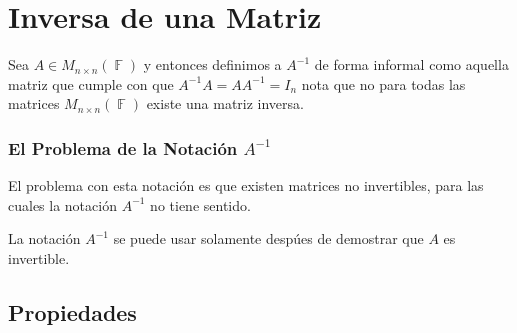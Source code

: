 \documentclass[12pt, fleqn]{report}                             %
\theoremstyle{break}                                            %
\DeclareMathOperator \GenericField {\mathbb{F}}                 %
\begin{document}
        \clearpage
        \section{Inversa de una Matriz}

            Sea $A \in M_{n \times n}(\GenericField)$ y entonces definimos a $A^{-1}$ 
            de forma informal como aquella matriz que cumple con que $A^{-1}A = AA^{-1} = I_{n}$
            nota que no para todas las matrices $M_{n \times n}(\GenericField)$ existe una matriz inversa.


           \subsubsection*{El Problema de la Notación $A^{-1}$}

           El problema con esta notación es que existen matrices no invertibles, para las cuales
           la notación $A^{-1}$ no tiene sentido.

           La notación $A^{-1}$ se puede usar solamente despúes de demostrar que $A$ es invertible.

            \clearpage
            \subsection{Propiedades}
\end{document}
